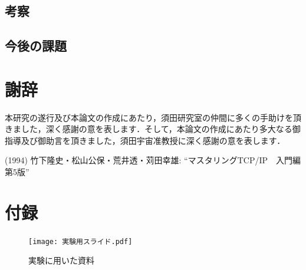 \documentclass[12pt,a4j,titlepage]{ltjsarticle}
\begin{document}
\clearpage


\subsection{考察}
\subsection{今後の課題}



\clearpage



\section{謝辞}
本研究の遂行及び本論文の作成にあたり，須田研究室の仲間に多くの手助けを頂きました，深く感謝の意を表します．そして，本論文の作成にあたり多大なる御指導及び御助言を頂きました，須田宇宙准教授に深く感謝の意を表します．

\clearpage

\begin{thebibliography}{99}
 (1994) 竹下隆史・松山公保・荒井透・苅田幸雄: ``マスタリングTCP/IP　入門編第5版''

\cite{inagaki}
\cite{TCP/IP}
\cite{suzuki}

\end{thebibliography}



\section{付録}

\begin{figure}[!htb]
  \centering
  \texttt{[image: 実験用スライド.pdf]}
  \caption{実験に用いた資料}
  \label{fig:jikkenn}
\end{figure}
\end{document}
